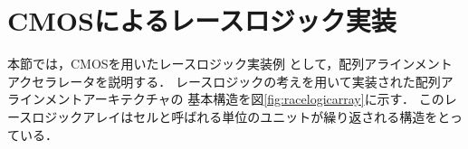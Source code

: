 \section{CMOSによるレースロジック実装}
本節では，CMOSを用いたレースロジック実装例\cite{madhavan2014race,madhavan2015race,madhavan20174}
として，配列アラインメントアクセラレータを説明する．
レースロジックの考えを用いて実装された配列アラインメントアーキテクチャの
基本構造を図\ref{fig:racelogicarray}に示す．
このレースロジックアレイはセルと呼ばれる単位のユニットが繰り返される構造をとっている．
\begin{figure}[t!]
\begin{center}
\subfigure[レースロジックアレイの構成]{
}
\end{center}
\end{figure}

